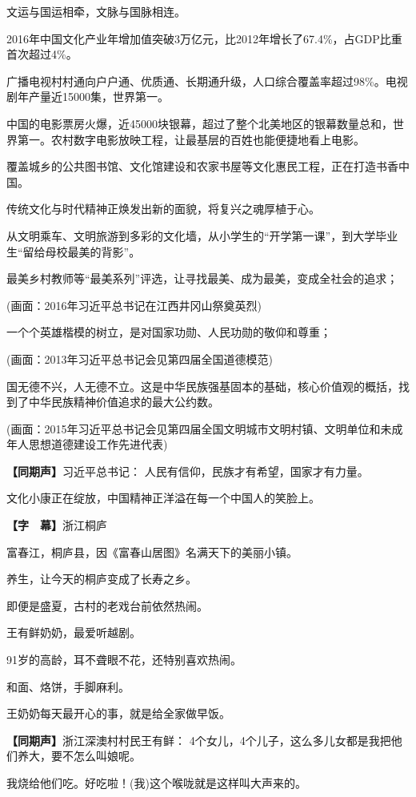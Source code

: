 \documentclass{ctexart}
\newcommand{\zkh}[1]{\textbf{\hspace{-2.7em} 【#1】}}
\begin{document}
 文运与国运相牵，文脉与国脉相连。

2016年中国文化产业年增加值突破3万亿元，比2012年增长了67.4{\%}，占GDP比重首次超过4{\%}。

广播电视村村通向户户通、优质通、长期通升级，人口综合覆盖率超过98{\%}。电视剧年产量近15000集，世界第一。

中国的电影票房火爆，近45000块银幕，超过了整个北美地区的银幕数量总和，世界第一。农村数字电影放映工程，让最基层的百姓也能便捷地看上电影。

覆盖城乡的公共图书馆、文化馆建设和农家书屋等文化惠民工程，正在打造书香中国。

 传统文化与时代精神正焕发出新的面貌，将复兴之魂厚植于心。

从文明乘车、文明旅游到多彩的文化墙，从小学生的``开学第一课''，到大学毕业生``留给母校最美的背影''。

 最美乡村教师等``最美系列''评选，让寻找最美、成为最美，变成全社会的追求；

 (画面：2016年习近平总书记在江西井冈山祭奠英烈)

 一个个英雄楷模的树立，是对国家功勋、人民功勋的敬仰和尊重；

 (画面：2013年习近平总书记会见第四届全国道德模范)

国无德不兴，人无德不立。这是中华民族强基固本的基础，核心价值观的概括，找到了中华民族精神价值追求的最大公约数。

(画面：2015年习近平总书记会见第四届全国文明城市文明村镇、文明单位和未成年人思想道德建设工作先进代表)

 \zkh{同期声}习近平总书记： 人民有信仰，民族才有希望，国家才有力量。

 文化小康正在绽放，中国精神正洋溢在每一个中国人的笑脸上。

 \zkh{字　幕}浙江桐庐

 富春江，桐庐县，因《富春山居图》名满天下的美丽小镇。

 养生，让今天的桐庐变成了长寿之乡。

 即便是盛夏，古村的老戏台前依然热闹。

 王有鲜奶奶，最爱听越剧。

 91岁的高龄，耳不聋眼不花，还特别喜欢热闹。

 和面、烙饼，手脚麻利。

 王奶奶每天最开心的事，就是给全家做早饭。

 \zkh{同期声}浙江深澳村村民王有鲜： 4个女儿，4个儿子，这么多儿女都是我把他们养大，要不怎么叫娘呢。

 我烧给他们吃。好吃啦！(我)这个喉咙就是这样叫大声来的。
\end{document}
